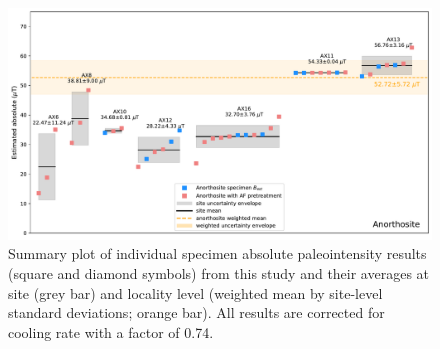 \documentclass[9pt,twocolumn,twoside,lineno]{pnas-new}
\begin{document}


\begin{figure}[h!]
\noindent\includegraphics[width=17.8 cm]{Paleointensity_plot_cooling_corrected.pdf}
\centering
\caption{\small{Summary plot of individual specimen absolute paleointensity results (square and diamond symbols) from this study and their averages at site (grey bar) and locality level (weighted mean by site-level standard deviations; orange bar). All results are corrected for cooling rate with a factor of 0.74. }}
\label{fig:PINT_cooling_corrected}
\end{figure}
\end{document}
